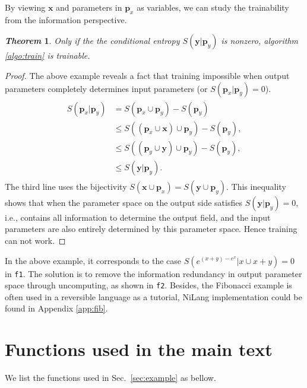 \documentclass[aps,twocolumn,longbibliography,english,superscriptaddress]{revtex4-1}
\newcommand{\<}{\langle}
\renewcommand{\>}{\rangle}
\newcommand{\vx}{{\mathbf{x}}}
\newcommand{\vp}{{\mathbf{p}}}
\newcommand{\vy}{{\mathbf{y}}}
\newcommand{\Sec}[1]{Sec.~\ref{#1}}
\newcommand{\App}[1]{Appendix \ref{#1}}
\newtheorem{theorem}{\textit{Theorem}}
\theoremstyle{definition}\newtheorem{definition}{\textit{Definition}}
\begin{document}
By viewing $\vx$ and parameters in $\vp_x$ as variables, we can study the trainability from the information perspective.
\begin{theorem}
    Only if the the conditional entropy $S(\vy|\vp_y)$ is nonzero, algorithm \ref{algo:train} is trainable.
\end{theorem}
\begin{proof}
The above example reveals a fact that training impossible when output parameters completely determines input parameters (or $S(\vp_x | \vp_y) = 0$).
\begin{align}
    \begin{split}
        S(\vp_x | \vp_y) &= S(\vp_x \cup \vp_y) - S(\vp_y)\\
        &\leq S\left((\vp_x \cup \vx) \cup \vp_y \right) - S(\vp_y),\\
        &\leq S\left((\vp_y \cup \vy) \cup \vp_y\right) - S(\vp_y),\\
    &\leq S(\vy|\vp_y).
    \end{split}
\end{align}
The third line uses the bijectivity $S(\vx \cup \vp_x) = S(\vy \cup \vp_y)$.
This inequality shows that when the parameter space on the output side satisfies $S(\vy | \vp_y) = 0$, i.e., contains all information to determine the output field, and the input parameters are also entirely determined by this parameter space. Hence training can not work.
\end{proof}
In the above example, it corresponds to the case $S\left(e^{(x+y)-e^x} | x \cup x + y\right) = 0$ in \texttt{f1}.
The solution is to remove the information redundancy in output parameter space through uncomputing, as shown in \texttt{f2}.
Besides, the Fibonacci example is often used in a reversible language as a tutorial, NiLang implementation could be found in \App{app:fib}.

\section{Functions used in the main text}\label{app:functions}

We list the functions used in \Sec{sec:example} as bellow.
\end{document}
